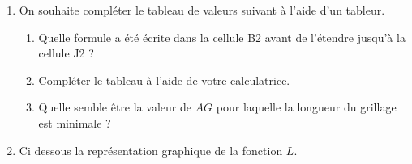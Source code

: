 \documentclass[main.tex]{subfiles}
\begin{document}
\begin{problem}
\begin{enumerate}
		Justifier que $L(x)=x+\frac{90}{x}-1$.
		
		\item On souhaite compléter le tableau de valeurs suivant à l'aide d'un tableur.
		
		\begin{figure}[h]\centering
		\end{figure}
		\begin{enumerate}
			\item Quelle formule a été écrite dans la cellule {\helvbx B2} avant de l'étendre jusqu'à la cellule {\helvbx J2} ?
			\item Compléter le tableau à l'aide de votre calculatrice.
			\item Quelle semble être la valeur de $AG$ pour laquelle la longueur du grillage est minimale ?
		\end{enumerate}
		\item Ci dessous la représentation graphique de la fonction $L$.
		

\end{enumerate}
\end{problem}
\end{document}
